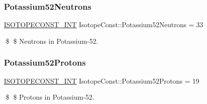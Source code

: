 \subsubsection{\texorpdfstring{Potassium52\+Neutrons}{Potassium52Neutrons}}
{\footnotesize\ttfamily \mbox{\hyperlink{group___isotope_const-_macros_ga5f18360b3e99483a35c32d789e62621c}{I\+S\+O\+T\+O\+P\+E\+C\+O\+N\+S\+T\+\_\+\+I\+NT}} Isotope\+Const\+::\+Potassium52\+Neutrons = 33}

\$ \$ Neutrons in Potassium-\/52. \mbox{\label{group___isotope_const-_potassium-_k52_gafc1e5e49b92d9f5a7db5faae7257ad8b}} 
\subsubsection{\texorpdfstring{Potassium52\+Protons}{Potassium52Protons}}
{\footnotesize\ttfamily \mbox{\hyperlink{group___isotope_const-_macros_ga5f18360b3e99483a35c32d789e62621c}{I\+S\+O\+T\+O\+P\+E\+C\+O\+N\+S\+T\+\_\+\+I\+NT}} Isotope\+Const\+::\+Potassium52\+Protons = 19}

\$ \$ Protons in Potassium-\/52. 
